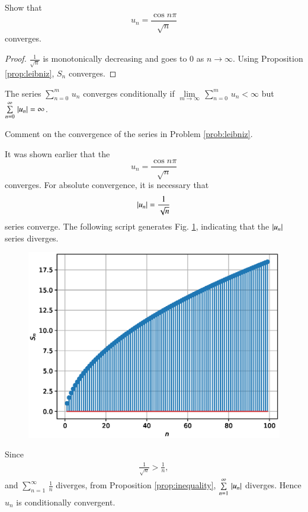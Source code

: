 \documentclass[journal,12pt,twocolumn]{IEEEtran}
\begin{document}
\begin{problem}
Show that 
\begin{equation}
u_n = \frac{\cos n\pi}{\sqrt{n}}
\end{equation}
converges.
\end{problem}
\begin{proof}
$\frac{1}{\sqrt{n}}$ is monotonically decreasing and goes to 0 as $n \rightarrow \infty$.  Using Proposition \ref{prop:leibniz}, $S_n$ converges.
\end{proof}
\begin{definition}
The series $\sum \limits _{{n=0}}^{m}\,u_{n}$ converges conditionally if $\lim \limits _{{m\rightarrow \infty }}\,\sum \limits _{{n=0}}^{m}\,u_{n} < \infty$  but
$\sum \limits _{{n=0}}^{\infty}\, \left\vert u_n\right\vert = \infty$.
\end{definition}
\begin{problem}
Comment on the convergence of the series in Problem \ref{prob:leibniz}.
\end{problem}
\solution It was shown earlier that the
\begin{equation}
u_n = \frac{\cos n\pi}{\sqrt{n}}
\end{equation}
converges. 
For absolute convergence, it is necessary that
\begin{equation}
\left\vert u_n\right\vert = \frac{1}{\sqrt n}
\end{equation}
series converge.  The following script generates Fig. \ref{fig:8}, indicating that the $\left\vert u_n\right\vert$ series diverges.

%
\begin{figure}[!ht]
\begin{center}
\includegraphics[width=\columnwidth]{./figs/8.eps}
\end{center}
\label{fig:8}	
\end{figure}
Since
\begin{align}
\frac{1}{\sqrt{n}} > \frac{1}{n},
\end{align}
and $\sum \limits _{{n=1}}^{\infty}\,\frac{1}{n} $ diverges, from Proposition \ref{prop:inequality}, $\sum \limits _{{n=1}}^{\infty}\,\left\vert u_n\right\vert $ diverges.  Hence $u_n$ 
is conditionally convergent.
\end{document}
